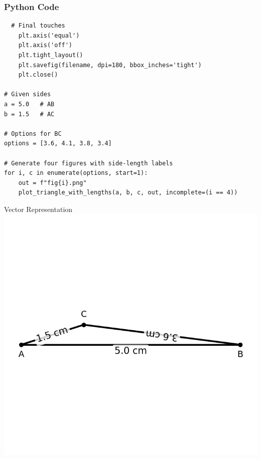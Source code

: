 \documentclass{beamer}
\begin{document}
\begin{frame}[fragile]
    \frametitle{Python Code}
    \begin{lstlisting}
  # Final touches
    plt.axis('equal')
    plt.axis('off')
    plt.tight_layout()
    plt.savefig(filename, dpi=180, bbox_inches='tight')
    plt.close()

# Given sides
a = 5.0   # AB
b = 1.5   # AC

# Options for BC
options = [3.6, 4.1, 3.8, 3.4]

# Generate four figures with side-length labels
for i, c in enumerate(options, start=1):
    out = f"fig{i}.png"
    plot_triangle_with_lengths(a, b, c, out, incomplete=(i == 4)) 
    \end{lstlisting}
\end{frame}

\begin{frame}{Vector Representation}
   \centering
    \includegraphics[width=\columnwidth, height=0.8\textheight, keepaspectratio]{figs/fig1.png}
    \label{fig:Beamer/figs/fig1.png}
\end{frame}
\end{document}
